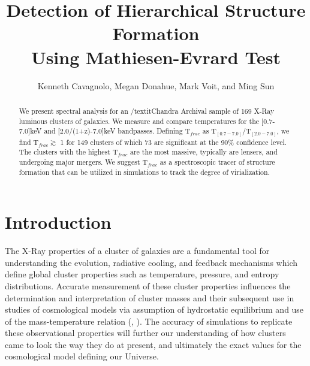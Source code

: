 \documentclass[12pt, preprint]{aastex}
\begin{document}
\title{Detection of Hierarchical Structure Formation\\
       Using Mathiesen-Evrard Test}
\author{Kenneth Cavagnolo, Megan Donahue, Mark Voit, and Ming Sun}


\begin{abstract}
We present spectral analysis for an {/textit{Chandra}} Archival sample of 169 X-Ray
luminous clusters of galaxies. We measure and compare temperatures for
the [0.7-7.0]keV and [2.0/(1+z)-7.0]keV bandpasses. Defining
T$_{frac}$ as T$_{[0.7-7.0]}/$T$_{[2.0-7.0]}$, we find T$_{frac}
\gtrsim$ 1 for 149 clusters of which 73 are significant at the 90\%
confidence level. The clusters with the highest T$_{frac}$ are the most massive, typically are
lensers, and undergoing major mergers. We suggest T$_{frac}$ as a spectroscopic
tracer of structure formation that can be utilized in simulations to
track the degree of virialization.
\end{abstract}



\section{Introduction}\label{sec:intro}

The X-Ray properties of a cluster of galaxies are a fundamental tool
for understanding the evolution, radiative cooling, and
feedback mechanisms which define global cluster
properties such as temperature, pressure, and entropy
distributions. Accurate measurement of these cluster properties influences the
determination and interpretation of cluster masses and their subsequent use in
studies of cosmological models via assumption of hydrostatic
equilibrium and use of the mass-temperature relation
(\cite{2005RvMP...77..207V},
\cite{1996ApJ...469..494E}). The accuracy of simulations to replicate
these observational properties will further our understanding of how
clusters came to look the way they do at present, and ultimately the
exact values for the cosmological model defining our Universe.
\end{document}
